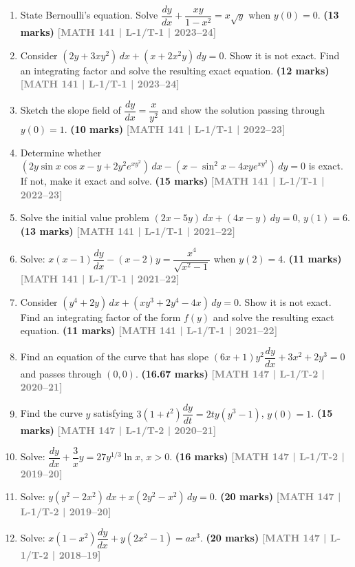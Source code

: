 \documentclass[12pt,a4paper]{article}
\newcommand{\yr}[1]{\hfill\textcolor{gray}{\small\textbf{[#1]}}}
\newcommand{\mk}[1]{\textcolor{orange!70!black}{\small\textbf{(#1 marks)}}}
\begin{document}
\begin{enumerate}\item State Bernoulli's equation. Solve $\dfrac{dy}{dx}+\dfrac{xy}{1-x^{2}}=x\sqrt{y}$ when $y(0)=0$.
\mk{13} \yr{MATH 141 | L-1/T-1 | 2023--24}

\item Consider $(2y+3xy^{2})\,dx+(x+2x^{2}y)\,dy=0$. Show it is not exact. Find an integrating factor and solve the resulting exact equation.
\mk{12} \yr{MATH 141 | L-1/T-1 | 2023--24}

\item Sketch the slope field of $\dfrac{dy}{dx}=\dfrac{x}{y^{2}}$ and show the solution passing through $y(0)=1$.
\mk{10} \yr{MATH 141 | L-1/T-1 | 2022--23}

\item Determine whether $(2y\sin x\cos x-y+2y^{2}e^{xy^{2}})\,dx-(x-\sin^{2}x-4xye^{xy^{2}})\,dy=0$ is exact. If not, make it exact and solve.
\mk{15} \yr{MATH 141 | L-1/T-1 | 2022--23}

\item Solve the initial value problem $(2x-5y)\,dx+(4x-y)\,dy=0$, $y(1)=6$.
\mk{13} \yr{MATH 141 | L-1/T-1 | 2021--22}

\item Solve: $x(x-1)\dfrac{dy}{dx}-(x-2)y=\dfrac{x^{4}}{\sqrt{x^{2}-1}}$ when $y(2)=4$.
\mk{11} \yr{MATH 141 | L-1/T-1 | 2021--22}

\item Consider $(y^{4}+2y)\,dx+(xy^{3}+2y^{4}-4x)\,dy=0$. Show it is not exact. Find an integrating factor of the form $f(y)$ and solve the resulting exact equation.
\mk{11} \yr{MATH 141 | L-1/T-1 | 2021--22}

\item Find an equation of the curve that has slope $(6x+1)y^{2}\dfrac{dy}{dx}+3x^{2}+2y^{3}=0$ and passes through $(0,0)$.
\mk{16.67} \yr{MATH 147 | L-1/T-2 | 2020--21}

\item Find the curve $y$ satisfying $3(1+t^{2})\dfrac{dy}{dt}=2ty(y^{3}-1)$, $y(0)=1$.
\mk{15} \yr{MATH 147 | L-1/T-2 | 2020--21}

\item Solve: $\dfrac{dy}{dx}+\dfrac{3}{x}y=27y^{1/3}\ln x$, $x>0$.
\mk{16} \yr{MATH 147 | L-1/T-2 | 2019--20}

\item Solve: $y(y^{2}-2x^{2})\,dx+x(2y^{2}-x^{2})\,dy=0$.
\mk{20} \yr{MATH 147 | L-1/T-2 | 2019--20}

\item Solve: $x(1-x^{2})\dfrac{dy}{dx}+y(2x^{2}-1)=ax^{3}$.
\mk{20} \yr{MATH 147 | L-1/T-2 | 2018--19}


\end{enumerate}
\end{document}
